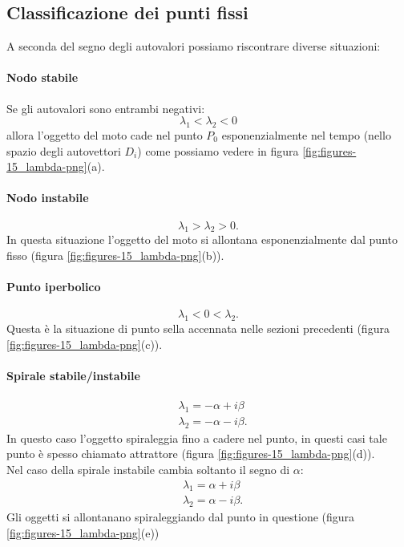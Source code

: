 \subsection{Classificazione dei punti fissi}%
\label{sub:Classificazione dei punti fissi}
A seconda del segno degli autovalori possiamo riscontrare diverse situazioni:
\paragraph{Nodo stabile}%
\label{par:Nodo stabile}
Se gli autovalori sono entrambi negativi:
\[
    \lambda_1<\lambda_2<0
\] 
allora l'oggetto del moto cade nel punto $P_0$ esponenzialmente nel tempo (nello spazio degli autovettori $D_i$) come possiamo vedere in figura \ref{fig:figures-15_lambda-png}(a).
\paragraph{Nodo instabile}%
\label{par:Nodo instabile}
\[
    \lambda_1 > \lambda_2 > 0
.\] 
In questa situazione l'oggetto del moto si allontana esponenzialmente dal punto fisso (figura \ref{fig:figures-15_lambda-png}(b)).
\paragraph{Punto iperbolico}%
\label{par:Punto iperbolico}
\[
    \lambda_1<0<\lambda_2
.\] 
Questa è la situazione di punto sella accennata nelle sezioni precedenti (figura \ref{fig:figures-15_lambda-png}(c)).
\paragraph{Spirale stabile/instabile}%
\label{par:Spirale stabile}
\[\begin{aligned}
    & \lambda_1 = -\alpha+i\beta\\
    & \lambda_2=-\alpha-i\beta
.\end{aligned}\]
In questo caso l'oggetto spiraleggia fino a cadere nel punto, in questi casi tale punto è spesso chiamato attrattore (figura \ref{fig:figures-15_lambda-png}(d)).\\
Nel caso della spirale instabile cambia soltanto il segno di $\alpha$:
\[\begin{aligned}
    & \lambda_1 = \alpha+i\beta\\
    & \lambda_2= \alpha-i\beta
.\end{aligned}\]
Gli oggetti si allontanano spiraleggiando dal punto in questione (figura \ref{fig:figures-15_lambda-png}(e))
